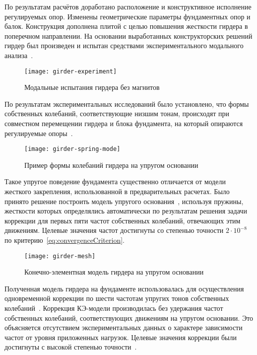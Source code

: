По результатам расчётов доработано расположение и конструктивное исполнение регулируемых опор. Изменены геометрические параметры фундаментных опор и балок. Конструкция дополнена плитой с целью повышения жесткости гирдера в поперечном направлении. На основании выработанных конструкторских решений гирдер был произведен и испытан средствами экспериментального модального анализа~.

\begin{figure}[H]
	\centering
	\texttt{[image: girder-experiment]}
	\caption{Модальные испытания гирдера без магнитов} \label{fig:girder-experiment}
\end{figure}

По результатам экспериментальных исследований было установлено, что формы собственных колебаний, соответствующие низшим тонам, происходят при совместном перемещении гирдера и блока фундамента, на который опираются регулируемые опоры~.

\begin{figure}[!htb]
	\centering
	\texttt{[image: girder-spring-mode]}
	\caption{Пример формы колебаний гирдера на упругом основании} \label{fig:girder-spring-mode}
\end{figure} 

Такое упругое поведение фундамента существенно отличается от модели жесткого закрепления, использованной в предварительных расчетах. Было принято решение построить модель упругого основания~, используя пружины, жесткости которых определялись автоматически по результатам решения задачи коррекции для первых пяти частот собственных колебаний, отвечающих этим движениям. Целевые значения частот достигнуты со степенью точности $ 2 \cdot 10 ^ {-8} $ по критерию~\eqref{eq:convergenceCriterion}.

\begin{figure}[H]
	\centering
	\texttt{[image: girder-mesh]}
	\caption{Конечно-элементная модель гирдера на упругом основании} \label{fig:girder-mesh}
\end{figure}

Полученная модель гирдера на фундаменте использовалась для осуществления одновременной коррекции по шести частотам упругих тонов собственных колебаний~. Коррекция КЭ-модели производилась без удержания частот собственных колебаний, соответствующих движениям на упругом основании. Это объясняется отсутствием  экспериментальных данных о характере зависимости частот от уровня приложенных нагрузок. Целевые значения коррекции были достигнуты с высокой степенью точности~.

